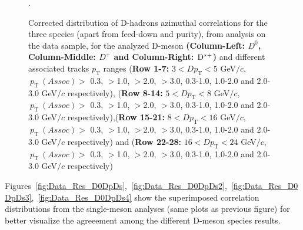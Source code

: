 \begin{figure}[!htbp]
\caption{Corrected distribution of D-hadrons azimuthal correlations for the three species (apart from feed-down and purity), from analysis on the data sample, for the analyzed D-meson \textbf{(Column-Left: $D^0$, Column-Middle: $D^+$ and Column-Right: ${\rm D^{*+}}$)} and different associated tracks $p_\text{T}$ ranges (\textbf{Row 1-7:} $3 < D p_\text{T} < 5$ GeV$/c$, $ \ p_\text{T}~(Assoc)>$ 0.3, $>$1.0, $>$2.0, $>$3.0, 0.3-1.0, 1.0-2.0 and 2.0-3.0 GeV$/c$ respectively), (\textbf{Row 8-14:} $5 < D p_\text{T} < 8$ GeV$/c$, $ \ p_\text{T}~(Assoc)>$ 0.3, $>$1.0, $>$2.0, $>$3.0, 0.3-1.0, 1.0-2.0 and 2.0-3.0 GeV$/c$ respectively),(\textbf{Row 15-21:} $8 < D p_\text{T} < 16$ GeV$/c$, $ \ p_\text{T}~(Assoc)>$ 0.3, $>$1.0, $>$2.0, $>$3.0, 0.3-1.0, 1.0-2.0 and 2.0-3.0 GeV$/c$ respectively) and (\textbf{Row 22-28:} $16 < D p_\text{T} < 24$ GeV$/c$, $ \ p_\text{T}~(Assoc)>$ 0.3, $>$1.0, $>$2.0, $>$3.0, 0.3-1.0, 1.0-2.0 and 2.0-3.0 GeV$/c$ respectively) }.
\label{fig:DataD0DpDs}
\end{figure}

Figures~\ref{fig:Data_Res_D0DpDs},~\ref{fig:Data_Res_D0DpDs2},~\ref{fig:Data_Res_D0DpDs3},~\ref{fig:Data_Res_D0DpDs4} show the superimposed correlation distributions from the single-meson analyses (same plots as previous figure) for better visualize the agreeement among the different D-meson species results.

\clearpage
\newpage

